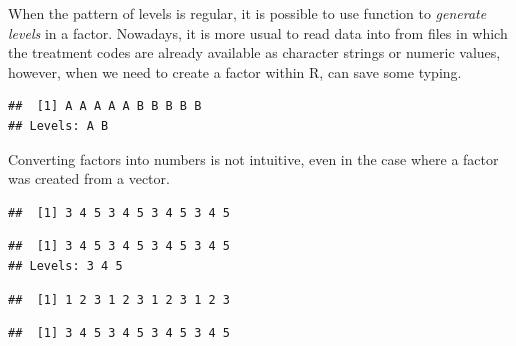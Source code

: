 \documentclass[krantz2]{krantz}\usepackage{knitr}
\begin{document}
\begin{explainbox}
When the pattern of levels is regular, it is possible to use function  to \emph{generate levels} in a factor. Nowadays, it is more usual to read data into \Rlang from files in which the treatment codes are already available as character strings or numeric values, however, when we need to create a factor within R,  can save some typing.

\begin{knitrout}\footnotesize
{}\color{fgcolor}\begin{kframe}
\begin{alltt}
\hlstd{(}\hlstd{,} \hlstd{,}  \hlstd{=} \hlstd{(}\hlstd{,} \hlstd{))}
\end{alltt}
\begin{verbatim}
##  [1] A A A A A B B B B B
## Levels: A B
\end{verbatim}
\end{kframe}
\end{knitrout}
\end{explainbox}

Converting factors into numbers is not intuitive, even in the case where a factor was created from a  vector.

\begin{knitrout}\footnotesize
{}\color{fgcolor}\begin{kframe}
\begin{alltt}
 \hlkwb{<-} \hlstd{(}\hlopt{:}\hlstd{,} \hlstd{)}
\end{alltt}
\begin{verbatim}
##  [1] 3 4 5 3 4 5 3 4 5 3 4 5
\end{verbatim}
\begin{alltt}
 \hlkwb{<-} 
\end{alltt}
\begin{verbatim}
##  [1] 3 4 5 3 4 5 3 4 5 3 4 5
## Levels: 3 4 5
\end{verbatim}
\begin{alltt}
\end{alltt}
\begin{verbatim}
##  [1] 1 2 3 1 2 3 1 2 3 1 2 3
\end{verbatim}
\begin{alltt}
\hlstd{(}
\end{alltt}
\begin{verbatim}
##  [1] 3 4 5 3 4 5 3 4 5 3 4 5
\end{verbatim}
\end{kframe}
\end{knitrout}
\end{document}
